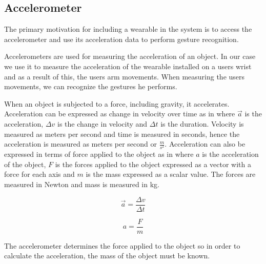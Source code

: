 \subsection{Accelerometer}

The primary motivation for including a wearable in the system is to access the accelerometer and use its acceleration data to perform gesture recognition.

Accelerometers are used for measuring the acceleration of an object. In our case we use it to measure the acceleration of the wearable installed on a users wrist and as a result of this, the users arm movements. When measuring the users movements, we can recognize the gestures he performs.

When an object is subjected to a force, including gravity, it accelerates. Acceleration can be expressed as change in velocity over time as in  where $\vec{a}$ is the acceleration, $\Delta v$ is the change in velocity and $\Delta t$ is the duration.
Velocity is measured as meters per second and time is measured in seconds, hence the acceleration is measured as meters per second or $\frac{m}{s^2}$.
Acceleration can also be expressed in terms of force applied to the object as in  where $a$ is the acceleration of the object, $F$ is the forces applied to the object expressed as a vector with a force for each axis and $m$ is the mass expressed as a scalar value.
The forces are measured in Newton and mass is measured in kg.

\begin{centering}
\begin{minipage}{.5\linewidth}
    \begin{equation}
    \vec{a} = \frac{\Delta v}{\Delta t}
    \label{eq:acceleration-delta-velocity}
    \end{equation}
\end{minipage}
\begin{minipage}{.5\linewidth}
    \begin{equation}
    a = \frac{F}{m}
    \label{eq:acceleration-force}
    \end{equation}
\end{minipage}
\end{centering}

The accelerometer determines the force applied to the object \cite[pp. 392-393]{Fraden:2112745} so in order to calculate the acceleration, the mass of the object must be known.

